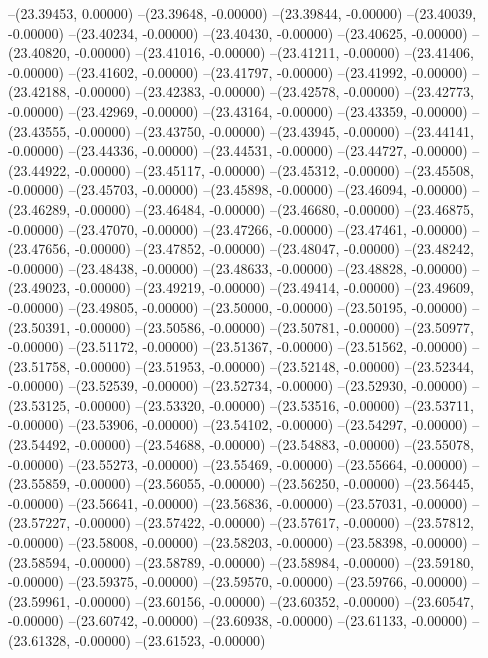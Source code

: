 --(23.39453, 0.00000)
--(23.39648, -0.00000)
--(23.39844, -0.00000)
--(23.40039, -0.00000)
--(23.40234, -0.00000)
--(23.40430, -0.00000)
--(23.40625, -0.00000)
--(23.40820, -0.00000)
--(23.41016, -0.00000)
--(23.41211, -0.00000)
--(23.41406, -0.00000)
--(23.41602, -0.00000)
--(23.41797, -0.00000)
--(23.41992, -0.00000)
--(23.42188, -0.00000)
--(23.42383, -0.00000)
--(23.42578, -0.00000)
--(23.42773, -0.00000)
--(23.42969, -0.00000)
--(23.43164, -0.00000)
--(23.43359, -0.00000)
--(23.43555, -0.00000)
--(23.43750, -0.00000)
--(23.43945, -0.00000)
--(23.44141, -0.00000)
--(23.44336, -0.00000)
--(23.44531, -0.00000)
--(23.44727, -0.00000)
--(23.44922, -0.00000)
--(23.45117, -0.00000)
--(23.45312, -0.00000)
--(23.45508, -0.00000)
--(23.45703, -0.00000)
--(23.45898, -0.00000)
--(23.46094, -0.00000)
--(23.46289, -0.00000)
--(23.46484, -0.00000)
--(23.46680, -0.00000)
--(23.46875, -0.00000)
--(23.47070, -0.00000)
--(23.47266, -0.00000)
--(23.47461, -0.00000)
--(23.47656, -0.00000)
--(23.47852, -0.00000)
--(23.48047, -0.00000)
--(23.48242, -0.00000)
--(23.48438, -0.00000)
--(23.48633, -0.00000)
--(23.48828, -0.00000)
--(23.49023, -0.00000)
--(23.49219, -0.00000)
--(23.49414, -0.00000)
--(23.49609, -0.00000)
--(23.49805, -0.00000)
--(23.50000, -0.00000)
--(23.50195, -0.00000)
--(23.50391, -0.00000)
--(23.50586, -0.00000)
--(23.50781, -0.00000)
--(23.50977, -0.00000)
--(23.51172, -0.00000)
--(23.51367, -0.00000)
--(23.51562, -0.00000)
--(23.51758, -0.00000)
--(23.51953, -0.00000)
--(23.52148, -0.00000)
--(23.52344, -0.00000)
--(23.52539, -0.00000)
--(23.52734, -0.00000)
--(23.52930, -0.00000)
--(23.53125, -0.00000)
--(23.53320, -0.00000)
--(23.53516, -0.00000)
--(23.53711, -0.00000)
--(23.53906, -0.00000)
--(23.54102, -0.00000)
--(23.54297, -0.00000)
--(23.54492, -0.00000)
--(23.54688, -0.00000)
--(23.54883, -0.00000)
--(23.55078, -0.00000)
--(23.55273, -0.00000)
--(23.55469, -0.00000)
--(23.55664, -0.00000)
--(23.55859, -0.00000)
--(23.56055, -0.00000)
--(23.56250, -0.00000)
--(23.56445, -0.00000)
--(23.56641, -0.00000)
--(23.56836, -0.00000)
--(23.57031, -0.00000)
--(23.57227, -0.00000)
--(23.57422, -0.00000)
--(23.57617, -0.00000)
--(23.57812, -0.00000)
--(23.58008, -0.00000)
--(23.58203, -0.00000)
--(23.58398, -0.00000)
--(23.58594, -0.00000)
--(23.58789, -0.00000)
--(23.58984, -0.00000)
--(23.59180, -0.00000)
--(23.59375, -0.00000)
--(23.59570, -0.00000)
--(23.59766, -0.00000)
--(23.59961, -0.00000)
--(23.60156, -0.00000)
--(23.60352, -0.00000)
--(23.60547, -0.00000)
--(23.60742, -0.00000)
--(23.60938, -0.00000)
--(23.61133, -0.00000)
--(23.61328, -0.00000)
--(23.61523, -0.00000)
